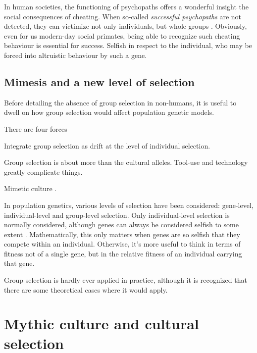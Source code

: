 \documentclass{article}
\begin{document}
In human societies, the functioning of psychopaths offers a wonderful insight
the social consequences of cheating. When so-called \emph{successful
psychopaths} are not detected, they can victimize not only individuals, but
whole groups \citep{babiak1995, boddy2006, boddy2010, kirkman2005}. Obviously,
even for us modern-day social primates, being able to recognize such cheating
behaviour is essential for success.  Selfish in respect to the individual, who
may be forced into altruistic behaviour by such a gene.

\subsection{Mimesis and a new level of selection}

Before detailing the absence of group selection in non-humans, it is useful to
dwell on how group selection would affect population genetic models.

There are four forces 

Integrate group selection as drift at the level of individual selection.

Group selection is about more than the cultural alleles. Tool-use and technology greatly complicate things.

Mimetic culture \citet{donald1991}.




In population genetics, various levels of selection have been considered: gene-level, individual-level and group-level selection. Only individual-level selection is normally considered, although genes can always be considered selfish to some extent \citep{dawkins1976}. Mathematically, this only matters when genes are so selfish that they compete within an individual. Otherwise, it's more useful to think in terms of fitness not of a single gene, but in the relative fitness of an individual carrying that gene.

Group selection is hardly ever applied in practice, although it is recognized that there are some theoretical cases where it would apply.


\section{Mythic culture and cultural selection}
\end{document}
